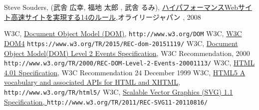 \begin{thebibliography}{99}
 Steve Souders,  (武舎 広幸, 福地 太郎 , 武舎 るみ),
\href{http://www.amazon.co.jp/%E3%83%8F%E3%82%A4%E3%83%91%E3%83%95%E3%82%A9%E3%83%BC%E3%83%9E%E3%83%B3%E3%82%B9Web%E3%82%B5%E3%82%A4%E3%83%88-%E2%80%95%E9%AB%98%E9%80%9F%E3%82%B5%E3%82%A4%E3%83%88%E3%82%92%E5%AE%9F%E7%8F%BE%E3%81%99%E3%82%8B14%E3%81%AE%E3%83%AB%E3%83%BC%E3%83%AB-Steve-Souders/dp/487311361X/ref=sr_1_1?ie=UTF8&qid=1304731142&sr=8-1}
{ハイパフォーマンスWebサイト\newline 高速サイトを実現する14のルール},オライリージャパン , 2008

\iffalse
 \bibitem{Stark}Jonathan Stark(増井 俊之, 牧野 聡 訳),\\
\href{http://www.amazon.co.jp/gp/product/4873114616/ref=cm_cr_asin_lnk}
{iPhoneアプリケーション開発ガイド　 HTML+CSS+JavaScript による開発手法},
オライリージャパン, 2010
\fi
 W3C, \href{http://www.w3.org/DOM}{Document Object Model (DOM)},
	 {\texttt{http://www.w3.org/DOM}}
 W3C,
				 \href{https://www.w3.org/TR/2015/REC-dom-20151119/}{W3C DOM4}
				 {\texttt{https://www.w3.org/TR/2015/REC-dom-20151119/}}
 W3C, 
\href{http://www.w3.org/TR/2000/REC-DOM-Level-2-Events-20001113/}
{Document Object Model(DOM) Level 2 Events Specification},
    W3C Recommendation, 2000
\texttt{http://www.w3.org/TR/2000/REC-DOM-Level-2-Events-20001113/}
 W3C, 
\href{http://www.w3.org/TR/html401/}
{HTML 4.01 Specification}, W3C Recommendation 24 December 1999
 W3C, \href{http://www.w3.org/TR/html5/}{HTML5
A vocabulary and associated APIs for HTML and XHTML}, \newline\texttt{http://www.w3.org/TR/html5/}
 W3C, \href{http://www.w3.org/TR/2011/REC-SVG11-20110816/}
      {Scalable Vector Graphics (SVG) 1.1 Specification, \protect\newline}
             {\texttt{http://www.w3.org/TR/2011/REC-SVG11-20110816/}}


\end{thebibliography}

